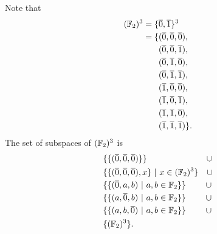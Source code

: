 \documentclass[12pt]{article}
\begin{document}
Note that
\begin{align*}
  (\mathbb{F}_2)^3 = \{&\overline 0, \overline 1\}^3\\
           = \{&(\overline 0, \overline 0, \overline 0),\\
               &(\overline 0, \overline 0, \overline 1),\\
               &(\overline 0, \overline 1, \overline 0),\\
               &(\overline 0, \overline 1, \overline 1),\\
               &(\overline 1, \overline 0, \overline 0),\\
               &(\overline 1, \overline 0, \overline 1),\\
               &(\overline 1, \overline 1, \overline 0),\\
               &(\overline 1, \overline 1, \overline 1)\}.
\end{align*}
The set of subspaces of $(\mathbb{F}_2)^3$ is
\begin{align*}
  &\{\{(\overline 0, \overline 0, \overline 0)\}\} ~~~~~~~~~~~~~~~~~~~~~ \cup\\
  &\{\{(\overline 0, \overline 0, \overline 0), x\} ~|~ x \in (\mathbb{F}_2)^3\} ~~~ \cup\\
  &\{\{(\overline 0, a, b) ~|~ a, b \in \mathbb{F}_2\}\}  ~~~~~~~ \cup\\
  &\{\{(a, \overline 0, b) ~|~ a, b \in \mathbb{F}_2\}\}  ~~~~~~~ \cup\\
  &\{\{(a, b, \overline 0) ~|~ a, b \in \mathbb{F}_2\}\}  ~~~~~~~ \cup\\
  &\{(\mathbb{F}_2)^3\}.
\end{align*}


\newpage
\end{document}
